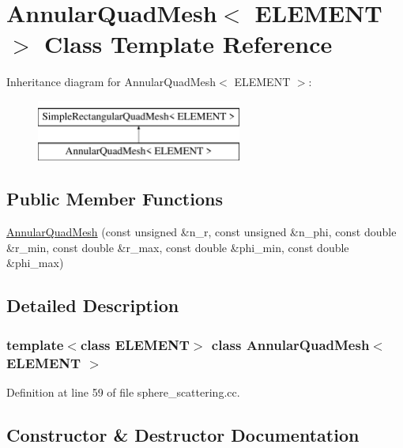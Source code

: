 \hypertarget{classAnnularQuadMesh}{}\section{Annular\+Quad\+Mesh$<$ E\+L\+E\+M\+E\+NT $>$ Class Template Reference}
\label{classAnnularQuadMesh}
Inheritance diagram for Annular\+Quad\+Mesh$<$ E\+L\+E\+M\+E\+NT $>$\+:\begin{figure}[H]
\begin{center}
\leavevmode
\includegraphics[height=2.000000cm]{classAnnularQuadMesh}
\end{center}
\end{figure}
\subsection*{Public Member Functions}
\begin{DoxyCompactItemize}
\item 
\hyperlink{classAnnularQuadMesh_acf01203e48fdee730b6c194bf538177c}{Annular\+Quad\+Mesh} (const unsigned \&n\+\_\+r, const unsigned \&n\+\_\+phi, const double \&r\+\_\+min, const double \&r\+\_\+max, const double \&phi\+\_\+min, const double \&phi\+\_\+max)
\end{DoxyCompactItemize}


\subsection{Detailed Description}
\subsubsection*{template$<$class E\+L\+E\+M\+E\+NT$>$\newline
class Annular\+Quad\+Mesh$<$ E\+L\+E\+M\+E\+N\+T $>$}



Definition at line 59 of file sphere\+\_\+scattering.\+cc.



\subsection{Constructor \& Destructor Documentation}
\mbox{\label{classAnnularQuadMesh_acf01203e48fdee730b6c194bf538177c}} 

